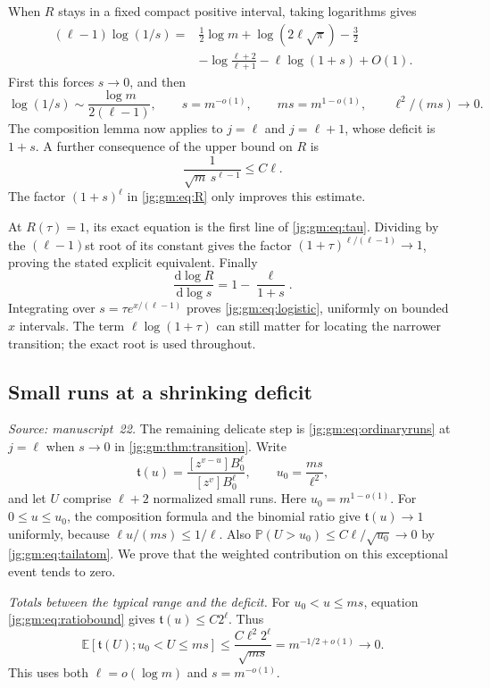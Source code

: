 \documentclass[11pt,a4paper]{article}
\theoremstyle{definition}\newaliascnt{definition}{theorem}
\theoremstyle{remark}\newaliascnt{remark}{theorem}
\newcommand{\dd}{\mathrm d}
\newcommand{\ljP}{\mathbb P}
\newcommand{\ljE}{\mathbb E}
\begin{document}
When $R$ stays in a fixed compact positive interval, taking logarithms gives
\begin{equation}\label{jg:gm:eq:logroot}
 \begin{split}
 (\ell-1)\log(1/s)
  ={}&\tfrac12\log m+\log(2\ell\sqrt\pi)-\tfrac32\\
    &-\log\frac{\ell+2}{\ell+1}-\ell\log(1+s)+O(1).
 \end{split}
\end{equation}
First this forces $s\to0$, and then
\[
 \log(1/s)\sim\frac{\log m}{2(\ell-1)},\qquad
 s=m^{-o(1)},\qquad ms=m^{1-o(1)},\qquad \ell^2/(ms)\to0.
\]
The composition lemma now applies to $j=\ell$ and $j=\ell+1$, whose deficit is
$1+s$. A further consequence of the upper bound on $R$ is
\begin{equation}\label{jg:gm:eq:keybound}
 \frac1{\sqrt m\,s^{\ell-1}}\le C\ell.
\end{equation}
The factor $(1+s)^\ell$ in \eqref{jg:gm:eq:R} only improves this estimate.

At $R(\tau)=1$, its exact equation is the first line of \eqref{jg:gm:eq:tau}.
Dividing by the $(\ell-1)$st root of its constant gives the factor
$(1+\tau)^{\ell/(\ell-1)}\to1$, proving the stated explicit equivalent. Finally
\[
 \frac{\dd\log R}{\dd\log s}=1-\frac{\ell}{1+s}.
\]
Integrating over $s=\tau e^{x/(\ell-1)}$ proves \eqref{jg:gm:eq:logistic},
uniformly on bounded $x$ intervals. The term $\ell\log(1+\tau)$ can still matter
for locating the narrower transition; the exact root is used throughout.

\subsection{Small runs at a shrinking deficit}
\label{jg:sec:gm-shrink}
\emph{Source: manuscript~22.} The remaining delicate step is
\eqref{jg:gm:eq:ordinaryruns} at $j=\ell$ when $s\to0$ in
\cref{jg:gm:thm:transition}. Write
\[
 \mathfrak t(u)=\frac{[z^{v-u}]B_0^\ell}{[z^v]B_0^\ell},
 \qquad u_0=\frac{ms}{\ell^2},
\]
and let $U$ comprise $\ell+2$ normalized small runs. Here $u_0=m^{1-o(1)}$. For
$0\le u\le u_0$, the composition formula and the binomial ratio give
$\mathfrak t(u)\to1$ uniformly, because $\ell u/(ms)\le1/\ell$. Also
$\ljP(U>u_0)\le C\ell/\sqrt{u_0}\to0$ by \eqref{jg:gm:eq:tailatom}. We prove
that the weighted contribution on this exceptional event tends to zero.

\emph{Totals between the typical range and the deficit.} For $u_0<u\le ms$,
equation \eqref{jg:gm:eq:ratiobound} gives $\mathfrak t(u)\le C2^\ell$. Thus
\begin{equation}\label{jg:gm:eq:range1}
 \ljE[\mathfrak t(U);u_0<U\le ms]
 \le\frac{C\ell^2 2^\ell}{\sqrt{ms}}
 =m^{-1/2+o(1)}\to0.
\end{equation}
This uses both $\ell=o(\log m)$ and $s=m^{-o(1)}$.
\end{document}
